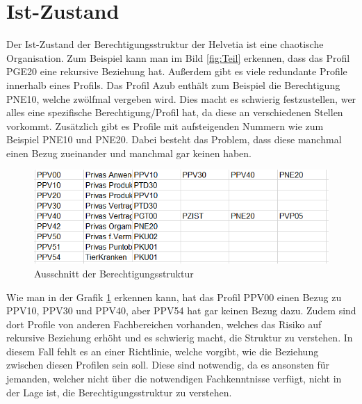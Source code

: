 \section{Ist-Zustand}
\label{sec:chapter03:Ist-Zustand}
Der Ist-Zustand der Berechtigungsstruktur der Helvetia ist eine chaotische Organisation.
Zum Beispiel kann man im Bild \ref{fig:Teil} erkennen, dass das Profil PGE20 eine rekursive Beziehung hat.
Außerdem gibt es viele redundante Profile innerhalb eines Profils.
Das Profil Azub enthält zum Beispiel die Berechtigung PNE10, welche zwölfmal vergeben wird.
Dies macht es schwierig festzustellen, wer alles eine spezifische Berechtigung/Profil hat, da diese an verschiedenen Stellen vorkommt.
\newline
Zusätzlich gibt es Profile mit aufsteigenden Nummern wie zum Beispiel PNE10 und PNE20.
Dabei besteht das Problem, dass diese manchmal einen Bezug zueinander und manchmal gar keinen haben.
\begin{figure}[h!]
 \centering
 \includegraphics[width=1\textwidth]{gfx/Picture/Beispiel.PNG}
 \caption{Ausschnitt der Berechtigungsstruktur}
 \label{fig:Profile}
\end{figure}
Wie man in der Grafik \ref{fig:Profile} erkennen kann, hat das Profil PPV00 einen Bezug zu PPV10, PPV30 und PPV40, aber PPV54 hat gar keinen Bezug dazu.
Zudem sind dort Profile von anderen Fachbereichen vorhanden, welches das Risiko auf rekursive Beziehung erhöht und es schwierig macht, die Struktur zu verstehen.
In diesem Fall fehlt es an einer Richtlinie, welche vorgibt, wie die Beziehung zwischen diesen Profilen sein soll.
Diese sind notwendig, da es ansonsten für jemanden, welcher nicht über die notwendigen Fachkenntnisse verfügt, nicht in der Lage ist, die Berechtigungsstruktur zu verstehen.